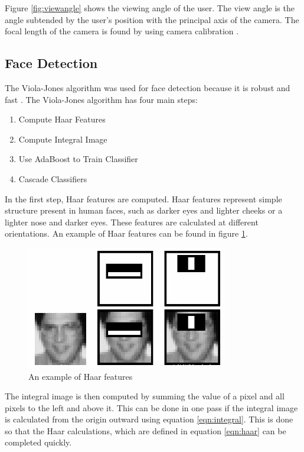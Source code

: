 \documentclass[12pt,twocolumn,letterpaper]{article}
\begin{document}
Figure \ref{fig:viewangle} shows the viewing angle of the user. The view angle is the angle subtended by the user's position with the principal axis of the camera. The focal length of the camera is found by using camera calibration \cite{calibration}. 

\subsection{Face Detection}
The Viola-Jones algorithm was used for face detection because it is robust and fast \cite{Viola-Jones}.  The Viola-Jones algorithm has four main steps:

\begin{enumerate}
\item Compute Haar Features
\item Compute Integral Image
\item Use AdaBoost to Train Classifier
\item Cascade Classifiers
\end{enumerate}

In the first step, Haar features are computed.  Haar features represent simple structure present in human faces, such as darker eyes and lighter cheeks or a lighter nose and darker eyes.  These features are calculated at different orientations. An example of Haar features can be found in figure \ref{fig:Haar}.

\begin{figure}[!htbp]
\centering
\includegraphics[scale=0.5]{haar}
\caption{An example of Haar features}
\label{fig:Haar}
\end{figure}

The integral image is then computed by summing the value of a pixel and all pixels to the left and above it.  This can be done in one pass if the integral image is calculated from the origin outward using equation \ref{eqn:integral}. This is done so that the Haar calculations, which are defined in equation \ref{eqn:haar} can be completed quickly.
\end{document}
